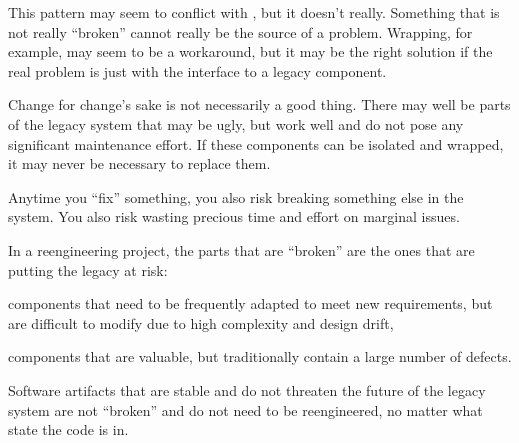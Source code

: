 \documentclass[a4paper,10pt,twoside]{book}
\begin{document}
This pattern may seem to conflict with , but it doesn't really. Something that is not really ``broken'' cannot really be the source of a problem. Wrapping, for example, may seem to be a workaround, but it may be the right solution if the real problem is just with the interface to a legacy component.




\discussion
Change for change's sake is not necessarily a good thing. There may well be parts of the legacy system that may be ugly, but work well and do not pose any significant maintenance effort. If these components can be isolated and wrapped, it may never be necessary to replace them.

Anytime you ``fix'' something, you also risk breaking something else in the system. You also risk wasting precious time and effort on marginal issues.

In a reengineering project, the parts that are ``broken'' are the ones that are putting the legacy at risk:
\begin{bulletlist}
  \item components that need to be frequently adapted to meet new requirements, but are difficult to modify due to high complexity and design drift,

  \item components that are valuable, but traditionally contain a large number of defects.

\end{bulletlist}

Software artifacts that are stable and do not threaten the future of the legacy system are not ``broken'' and do not need to be reengineered, no matter what state the code is in.


\end{document}
